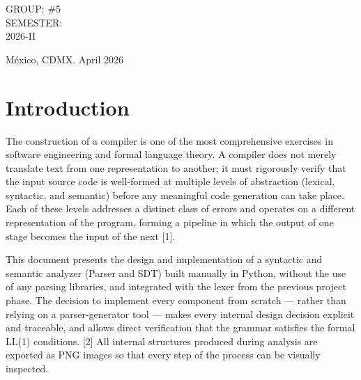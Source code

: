 \documentclass[letterpaper,12pt,oneside]{article}
\begin{document}
\begin{titlepage}
\begin{center}
\begin{center}
            \bigskip

            GROUP: \#5\\
            SEMESTER: \\
            2026-II
        \end{center}

        \vfill

        \begin{center}
            {México, CDMX. April 2026}\\
        \end{center}
        \cleardoublepage
    \end{center}
\end{titlepage}

\tableofcontents
\clearpage

\section{Introduction}
The construction of a compiler is one of the most comprehensive exercises
in software engineering and formal language theory. A compiler does not
merely translate text from one representation to another; it must
rigorously verify that the input source code is well-formed at multiple
levels of abstraction (lexical, syntactic, and semantic) before any
meaningful code generation can take place. Each of these levels addresses
a distinct class of errors and operates on a different representation of
the program, forming a pipeline in which the output of one stage becomes
the input of the next [1].

This document presents the design and implementation of a syntactic and
semantic analyzer (Parser and SDT) built manually in Python, without the
use of any parsing libraries, and integrated with the lexer from the
previous project phase. The decision to implement every component from
scratch — rather than relying on a parser-generator tool — makes every
internal design decision explicit and traceable, and allows direct
verification that the grammar satisfies the formal LL(1) conditions. [2]
All internal structures produced during analysis are exported as PNG
images so that every step of the process can be visually inspected.
\end{document}
